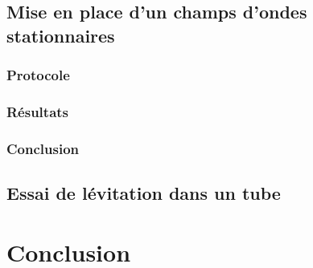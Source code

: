 \documentclass[a4paper,11pt]{report}
\begin{document}
\section{Mise en place d'un champs d'ondes stationnaires}

\subsection{Protocole}

\subsection{Résultats}

\subsection{Conclusion}

\section{Essai de lévitation dans un tube}

\chapter{Conclusion}
\end{document}
